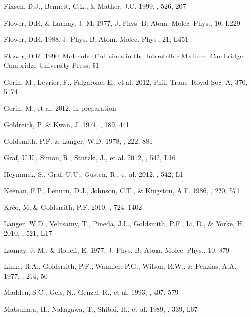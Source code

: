 \documentclass[12pt]{aastex}
\begin{document}
\begin{thebibliography}{}
Fixsen, D.J., Bennett, C.L., \& Mather, J.C. 1999, \apj, 526, 207

Flower, D.R. \& Launay, J.-M. 1977, J. Phys. B:  Atom. Molec. Phys., 10, L229

Flower, D.R. 1988, J. Phys. B: Atom. Molec. Phys., 21, L451

Flower, D.R. 1990, Molecular Collisions in the Interstellar Medium.  Cambridge:  Cambridge University Press, 61

Gerin, M., Levrier, F., Falgarone, E., et al. 2012, Phil. Trans. Royal Soc. A, 370, 5174

Gerin, M., et al. 2012, in preparation

Goldreich, P. \& Kwan, J. 1974, \apj, 189, 441

Goldsmith, P.F. \& Langer, W.D. 1978, \apj, 222, 881

Graf, U.U., Simon, R., Stutzki, J., et al. 2012, \aap, 542, L16

Heyminck, S., Graf, U.U., G\"{u}sten, R., et al. 2012, \aap, 542, L1

Keenan, F.P., Lennon, D.J., Johnson, C.T., \& Kingston, A.E. 1986, \mnras, 220, 571

Kr\v{c}o, M. \& Goldsmith, P.F. 2010, \apj, 724, 1402

Langer, W.D., Velusamy, T., Pineda, J.L., Goldsmith, P.F., Li, D., \& Yorke, H. 2010, \aap, 521, L17

Launay, J.-M., \& Roueff, E. 1977, J. Phys. B:  Atom. Molec. Phys., 10, 879

Linke, R.A., Goldsmith, P.F., Wannier, P.G., Wilson, R.W., \& Penzias, A.A. 1977, \apj, 214, 50

Madden, S.C., Geis, N., Genzel, R., et al. 1993, \apj, 407, 579

Matsuhara, H., Nakagawa, T., Shibai, H., et al. 1989, \apj, 339, L67


\end{thebibliography}
\end{document}

